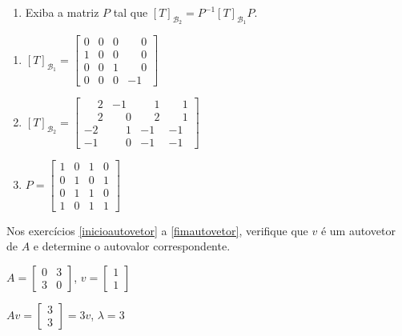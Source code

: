 \documentclass[12pt]{exam}
\begin{document}
\begin{exercicio}
\begin{enumerate}[label={\alph*})]
        \item Exiba a matriz $P$ tal que $[T]_{\mathcal{B}_2} = P^{-1}[T]_{\mathcal{B}_1}P$.
    \end{enumerate}
    \begin{solucao}
        \begin{enumerate}[label={\alph*})]
            \item $[T]_{\mathcal{B}_1} = \begin{bmatrix}
                0 & 0 & 0 & \phantom{-}0\\
                1 & 0 & 0 & \phantom{-}0\\
                0 & 0 & 1 & \phantom{-}0\\
                0 & 0 & 0 & -1
            \end{bmatrix}$

            \item $[T]_{\mathcal{B}_2} = \begin{bmatrix}
                \phantom{-}2 & -1 & \phantom{-}1 & \phantom{-}1\\
                \phantom{-}2 & \phantom{-}0 & \phantom{-}2 & \phantom{-}1\\
                -2 & \phantom{-}1 & -1 & -1\\
                -1 & \phantom{-}0 & -1 & -1
            \end{bmatrix}$

            \item $P = \begin{bmatrix}
                1 & 0 & 1 & 0\\
                0 & 1 & 0 & 1\\
                0 & 1 & 1 & 0\\
                1 & 0 & 1 & 1
            \end{bmatrix}$
        \end{enumerate}
    \end{solucao}
\end{exercicio}

Nos exercícios \eqref{inicioautovetor} a \eqref{fimautovetor}, verifique que $v$ é um autovetor de $A$ e determine o autovalor correspondente.

\begin{exercicio}\label{inicioautovetor}
    $A = \begin{bmatrix}0 & 3\\3 & 0\end{bmatrix}$, $v = \begin{bmatrix}1\\1\end{bmatrix}$
    \begin{solucao}
        $Av = \begin{bmatrix}3\\3\end{bmatrix} = 3v$, $\lambda = 3$
    \end{solucao}
\end{exercicio}
\end{document}
